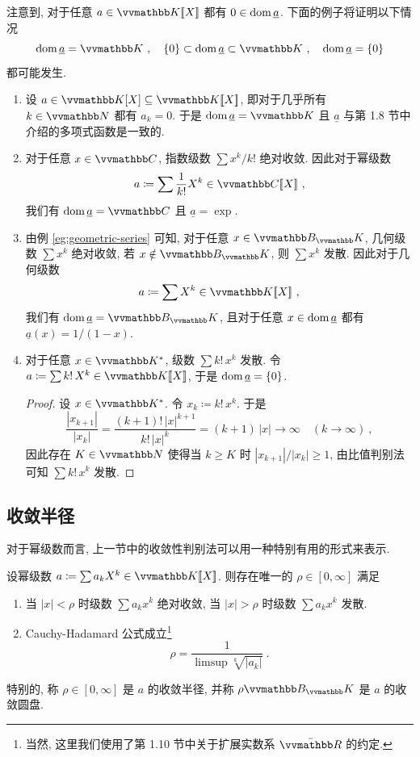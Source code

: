 注意到, 对于任意 \(a \in \K [\![X]\!]\) 都有 \(0 \in \operatorname{dom} \underline a\). 下面的例子将证明以下情况
\[
    \dom \underline a = \K\ ,\quad \{0\} \subset \dom \underline a \subset \K\ ,\quad \dom \underline a = \{0\}
\]
都可能发生.

\begin{example}
    \begin{enumerate}
        \item 设 \(a \in \K[X] \subseteq \K[\![X]\!]\), 即对于几乎所有 \(k \in \N\) 都有 \(a_k = 0\). 于是 \(\dom \underline a = \K\) 且 \(\underline a\) 与第 1.8 节中介绍的多项式函数是一致的.
        \item 对于任意 \(x \in \C\), 指数级数 \(\sum x^k / k!\) 绝对收敛. 因此对于幂级数
        \[
            a \coloneqq \sum \frac{1}{k!} X^k \in \C[\![X]\!]\ ,
        \]
        我们有 \(\dom \underline a = \C\) 且 \(\underline a = \exp\).
        \item 由例 \ref{eg:geometric-series} 可知, 对于任意 \(x \in \B_\K\), 几何级数 \(\sum x^k\) 绝对收敛, 若 \(x \notin \B_\K\), 则 \(\sum x^k\) 发散. 因此对于几何级数
        \[
            a \coloneqq \sum X^k \in \K[\![X]\!]\ ,
        \]
         我们有 \(\dom \underline a = \B_\K\), 且对于任意 \(x \in \operatorname{dom} \underline a\) 都有 \(\underline a(x) = 1 / (1 - x)\).
         \item 对于任意 \(x \in \K^\ast\), 级数 \(\sum k!\, x^k\) 发散. 令 \(a \coloneqq \sum k!\, X^k \in \K[\![X]\!]\), 于是 \(\operatorname{dom} \underline a = \{0\}\).
         \begin{proof}
            设 \(x \in \K^\ast\). 令 \(x_k \coloneqq k!\, x^k\). 于是
            \[
                \frac{|x_{k + 1}|}{|x_k|} = \frac{(k + 1)!\, |x|^{k + 1}}{k!\, |x|^k} = (k + 1)\, |x| \to \infty\quad (k \to \infty)\ ,
            \]
            因此存在 \(K \in \N\) 使得当 \(k \geq K\) 时 \(|x_{k + 1}| \big/ |x_k| \geq 1\), 由比值判别法可知 \(\sum k!\, x^k\) 发散.
         \end{proof}
    \end{enumerate}
\end{example}

\subsection{收敛半径}

对于幂级数而言, 上一节中的收敛性判别法可以用一种特别有用的形式来表示.

\begin{theorem}\label{thm:radius-of-convergence}
    设幂级数 \(a \coloneqq \sum a_k X^k \in \K[\![X]\!]\). 则存在唯一的 \(\rho \in [0, \infty]\) 满足
    \begin{enumerate}
        \item 当 \(|x| < \rho\) 时级数 \(\sum a_k x^k\) 绝对收敛, 当 \(|x| > \rho\) 时级数 \(\sum a_k x^k\) 发散.
        \item Cauchy-Hadamard 公式成立\footnote{当然, 这里我们使用了第 1.10 节中关于扩展实数系 \(\bar \R\) 的约定.}
        \[
            \rho = \frac{1}{\limsup \sqrt[k]{|a_k|}}\ .
        \]
    \end{enumerate}
    特别的, 称 \(\rho \in [0, \infty]\) 是 \(a\) 的收敛半径, 并称 \(\rho \B_\K\) 是 \(a\) 的收敛圆盘.
\end{theorem}

